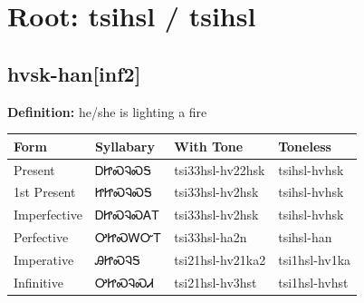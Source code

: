 \documentclass{article}%
\begin{document}
%
\normalsize%
\section*{Root: tsihsl / tsihsl}%
\subsection*{hvsk-han[inf2]}%
\textbf{Definition: }%
he/she is lighting a fire%
\\[0.5em]%
\begin{tabular}{|l|l|l|l|}%
\hline%
\textbf{Form}&\textbf{Syllabary}&\textbf{With Tone}&\textbf{Toneless}\\%
\hline%
Present&ᎠᏥᏍᎸᏍᎦ&tsi33hsl{-}hv22hsk&tsihsl{-}hvhsk\\%
1st Present&ᏥᏥᏍᎸᏍᎦ&tsi33hsl{-}hv2hsk&tsihsl{-}hvhsk\\%
Imperfective&ᎠᏥᏍᎸᏍᎪᎢ&tsi33hsl{-}hv2hsk&tsihsl{-}hvhsk\\%
Perfective&ᎤᏥᏍᎳᏅᎢ&tsi33hsl{-}ha2n&tsihsl{-}han\\%
Imperative&ᎯᏥᏍᎸᎦ&tsi21hsl{-}hv21ka2&tsi1hsl{-}hv1ka\\%
Infinitive&ᎤᏥᏍᎸᏍᏗ&tsi21hsl{-}hv3hst&tsi1hsl{-}hvhst\\%
\hline%
\end{tabular}%
\\[1em]%
\end{document}
